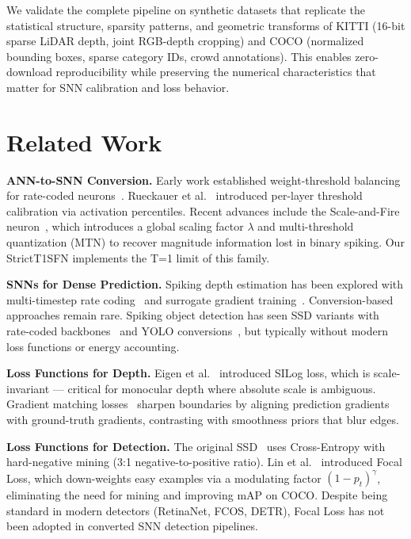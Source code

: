 \documentclass[10pt,conference]{IEEEtran}
\begin{document}
We validate the complete pipeline on synthetic datasets that replicate the statistical structure, sparsity patterns, and geometric transforms of KITTI (16-bit sparse LiDAR depth, joint RGB-depth cropping) and COCO (normalized bounding boxes, sparse category IDs, crowd annotations). This enables zero-download reproducibility while preserving the numerical characteristics that matter for SNN calibration and loss behavior.

\section{Related Work}
\label{sec:related}

\textbf{ANN-to-SNN Conversion.} Early work established weight-threshold balancing for rate-coded neurons~\cite{cao2015spiking, diehl2015fast}. Rueckauer et al.~\cite{rueckauer2017conversion} introduced per-layer threshold calibration via activation percentiles. Recent advances include the Scale-and-Fire neuron~\cite{kim2023scale}, which introduces a global scaling factor $\lambda$ and multi-threshold quantization (MTN) to recover magnitude information lost in binary spiking. Our StrictT1SFN implements the T=1 limit of this family.

\textbf{SNNs for Dense Prediction.} Spiking depth estimation has been explored with multi-timestep rate coding~\cite{perez2021spiking, xu2023spiking} and surrogate gradient training~\cite{zenke2021remarkable}. Conversion-based approaches remain rare. Spiking object detection has seen SSD variants with rate-coded backbones~\cite{kim2020spiking} and YOLO conversions~\cite{li2022spiking}, but typically without modern loss functions or energy accounting.

\textbf{Loss Functions for Depth.} Eigen et al.~\cite{eigen2014depth} introduced SILog loss, which is scale-invariant — critical for monocular depth where absolute scale is ambiguous. Gradient matching losses~\cite{chen2018single} sharpen boundaries by aligning prediction gradients with ground-truth gradients, contrasting with smoothness priors that blur edges.

\textbf{Loss Functions for Detection.} The original SSD~\cite{liu2016ssd} uses Cross-Entropy with hard-negative mining (3:1 negative-to-positive ratio). Lin et al.~\cite{lin2017focal} introduced Focal Loss, which down-weights easy examples via a modulating factor $(1-p_t)^\gamma$, eliminating the need for mining and improving mAP on COCO. Despite being standard in modern detectors (RetinaNet, FCOS, DETR), Focal Loss has not been adopted in converted SNN detection pipelines.
\end{document}
